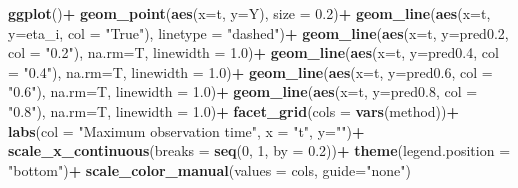 \documentclass[
]{article}
\newenvironment{Shaded}{\begin{snugshade}}{\end{snugshade}}
\newcommand{\AttributeTok}[1]{\textcolor[rgb]{0.13,0.29,0.53}{#1}}
\newcommand{\DecValTok}[1]{\textcolor[rgb]{0.00,0.00,0.81}{#1}}
\newcommand{\FloatTok}[1]{\textcolor[rgb]{0.00,0.00,0.81}{#1}}
\newcommand{\FunctionTok}[1]{\textcolor[rgb]{0.13,0.29,0.53}{\textbf{#1}}}
\newcommand{\NormalTok}[1]{#1}
\newcommand{\SpecialCharTok}[1]{\textcolor[rgb]{0.81,0.36,0.00}{\textbf{#1}}}
\newcommand{\StringTok}[1]{\textcolor[rgb]{0.31,0.60,0.02}{#1}}
\begin{document}
\begin{Shaded}
\begin{Highlighting}[]
  \FunctionTok{ggplot}\NormalTok{()}\SpecialCharTok{+}
  \FunctionTok{geom\_point}\NormalTok{(}\FunctionTok{aes}\NormalTok{(}\AttributeTok{x=}\NormalTok{t, }\AttributeTok{y=}\NormalTok{Y), }\AttributeTok{size =} \FloatTok{0.2}\NormalTok{)}\SpecialCharTok{+}
  \FunctionTok{geom\_line}\NormalTok{(}\FunctionTok{aes}\NormalTok{(}\AttributeTok{x=}\NormalTok{t, }\AttributeTok{y=}\NormalTok{eta\_i, }\AttributeTok{col =} \StringTok{"True"}\NormalTok{), }\AttributeTok{linetype =} \StringTok{"dashed"}\NormalTok{)}\SpecialCharTok{+}
  \FunctionTok{geom\_line}\NormalTok{(}\FunctionTok{aes}\NormalTok{(}\AttributeTok{x=}\NormalTok{t, }\AttributeTok{y=}\NormalTok{pred0}\FloatTok{.2}\NormalTok{, }\AttributeTok{col =} \StringTok{"0.2"}\NormalTok{), }\AttributeTok{na.rm=}\NormalTok{T, }\AttributeTok{linewidth =} \FloatTok{1.0}\NormalTok{)}\SpecialCharTok{+}
  \FunctionTok{geom\_line}\NormalTok{(}\FunctionTok{aes}\NormalTok{(}\AttributeTok{x=}\NormalTok{t, }\AttributeTok{y=}\NormalTok{pred0}\FloatTok{.4}\NormalTok{, }\AttributeTok{col =} \StringTok{"0.4"}\NormalTok{), }\AttributeTok{na.rm=}\NormalTok{T, }\AttributeTok{linewidth =} \FloatTok{1.0}\NormalTok{)}\SpecialCharTok{+}
  \FunctionTok{geom\_line}\NormalTok{(}\FunctionTok{aes}\NormalTok{(}\AttributeTok{x=}\NormalTok{t, }\AttributeTok{y=}\NormalTok{pred0}\FloatTok{.6}\NormalTok{, }\AttributeTok{col =} \StringTok{"0.6"}\NormalTok{), }\AttributeTok{na.rm=}\NormalTok{T, }\AttributeTok{linewidth =} \FloatTok{1.0}\NormalTok{)}\SpecialCharTok{+}
  \FunctionTok{geom\_line}\NormalTok{(}\FunctionTok{aes}\NormalTok{(}\AttributeTok{x=}\NormalTok{t, }\AttributeTok{y=}\NormalTok{pred0}\FloatTok{.8}\NormalTok{, }\AttributeTok{col =} \StringTok{"0.8"}\NormalTok{), }\AttributeTok{na.rm=}\NormalTok{T, }\AttributeTok{linewidth =} \FloatTok{1.0}\NormalTok{)}\SpecialCharTok{+}
  \FunctionTok{facet\_grid}\NormalTok{(}\AttributeTok{cols =} \FunctionTok{vars}\NormalTok{(method))}\SpecialCharTok{+}
  \FunctionTok{labs}\NormalTok{(}\AttributeTok{col =} \StringTok{"Maximum observation time"}\NormalTok{, }\AttributeTok{x =} \StringTok{"t"}\NormalTok{, }\AttributeTok{y=}\StringTok{""}\NormalTok{)}\SpecialCharTok{+}
  \FunctionTok{scale\_x\_continuous}\NormalTok{(}\AttributeTok{breaks =} \FunctionTok{seq}\NormalTok{(}\DecValTok{0}\NormalTok{, }\DecValTok{1}\NormalTok{, }\AttributeTok{by =} \FloatTok{0.2}\NormalTok{))}\SpecialCharTok{+}
  \FunctionTok{theme}\NormalTok{(}\AttributeTok{legend.position =} \StringTok{"bottom"}\NormalTok{)}\SpecialCharTok{+}
  \FunctionTok{scale\_color\_manual}\NormalTok{(}\AttributeTok{values =}\NormalTok{ cols, }\AttributeTok{guide=}\StringTok{"none"}\NormalTok{)}
\end{Highlighting}
\end{Shaded}
\end{document}
